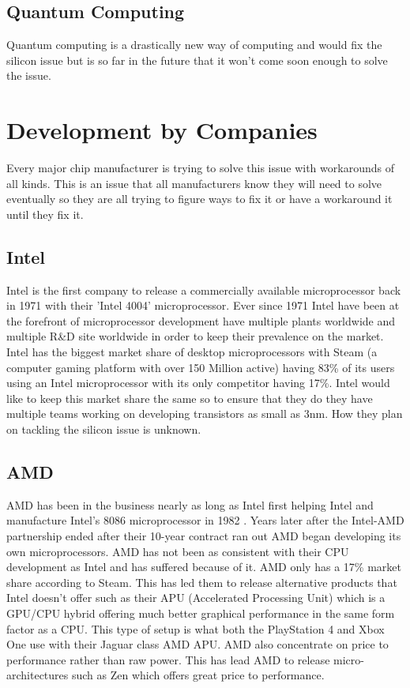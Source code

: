 \documentclass[journal]{IEEEtran}
\begin{document}
\subsection{Quantum Computing}
Quantum computing is a drastically new way of computing and would fix the silicon issue but is so far in the future that it won't come soon enough to solve the issue.

\section{Development by Companies}
Every major chip manufacturer is trying to solve this issue with workarounds of all kinds. This is an issue that all manufacturers know they will need to solve eventually so they are all trying to figure ways to fix it or have a workaround it until they fix it.

\subsection{Intel}
Intel is the first company to release a commercially available microprocessor back in 1971 with their 'Intel 4004' microprocessor. Ever since 1971 Intel have been at the forefront of microprocessor development have multiple plants worldwide and multiple R\&D site worldwide in order to keep their prevalence on the market. Intel has the biggest market share of desktop microprocessors with Steam (a computer gaming platform with over 150 Million active) having 83\% \cite{8732145520170101} of its users using an Intel microprocessor with its only competitor having 17\%. Intel would like to keep this market share the same so to ensure that they do they have multiple teams working on developing transistors as small as 3nm. How they plan on tackling the silicon issue is unknown.

\subsection{AMD}
AMD has been in the business nearly as long as Intel first helping Intel and manufacture Intel's 8086 microprocessor in 1982 \cite{8914118120180101}. Years later after the Intel-AMD partnership ended after their 10-year contract ran out AMD began developing its own microprocessors. AMD has not been as consistent with their CPU development as Intel and has suffered because of it. AMD only has a 17\% market share according to Steam. This has led them to release alternative products that Intel doesn't offer such as their APU (Accelerated Processing Unit) which is a GPU/CPU hybrid offering much better graphical performance in the same form factor as a CPU. This type of setup is what both the PlayStation 4 and Xbox One use with their Jaguar class AMD APU. AMD also concentrate on price to performance rather than raw power. This has lead AMD to release micro-architectures such as Zen which offers great price to performance.
\end{document}
